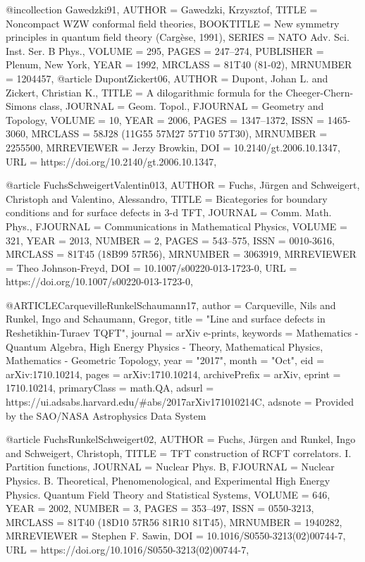 @incollection {Gawedzki91,
    AUTHOR = {Gaw\polhk edzki, Krzysztof},
     TITLE = {Noncompact {WZW} conformal field theories},
 BOOKTITLE = {New symmetry principles in quantum field theory ({C}arg\`ese,
              1991)},
    SERIES = {NATO Adv. Sci. Inst. Ser. B Phys.},
    VOLUME = {295},
     PAGES = {247--274},
 PUBLISHER = {Plenum, New York},
      YEAR = {1992},
   MRCLASS = {81T40 (81-02)},
  MRNUMBER = {1204457},
}
@article {DupontZickert06,
    AUTHOR = {Dupont, Johan L. and Zickert, Christian K.},
     TITLE = {A dilogarithmic formula for the {C}heeger-{C}hern-{S}imons
              class},
   JOURNAL = {Geom. Topol.},
  FJOURNAL = {Geometry and Topology},
    VOLUME = {10},
      YEAR = {2006},
     PAGES = {1347--1372},
      ISSN = {1465-3060},
   MRCLASS = {58J28 (11G55 57M27 57T10 57T30)},
  MRNUMBER = {2255500},
MRREVIEWER = {Jerzy Browkin},
       DOI = {10.2140/gt.2006.10.1347},
       URL = {https://doi.org/10.2140/gt.2006.10.1347},
}


@article {FuchsSchweigertValentin013,
    AUTHOR = {Fuchs, J\"{u}rgen and Schweigert, Christoph and Valentino,
              Alessandro},
     TITLE = {Bicategories for boundary conditions and for surface defects
              in 3-d {TFT}},
   JOURNAL = {Comm. Math. Phys.},
  FJOURNAL = {Communications in Mathematical Physics},
    VOLUME = {321},
      YEAR = {2013},
    NUMBER = {2},
     PAGES = {543--575},
      ISSN = {0010-3616},
   MRCLASS = {81T45 (18B99 57R56)},
  MRNUMBER = {3063919},
MRREVIEWER = {Theo Johnson-Freyd},
       DOI = {10.1007/s00220-013-1723-0},
       URL = {https://doi.org/10.1007/s00220-013-1723-0},
}

@ARTICLE{CarquevilleRunkelSchaumann17,
       author = {{Carqueville}, Nils and {Runkel}, Ingo and {Schaumann}, Gregor},
        title = "{Line and surface defects in Reshetikhin-Turaev TQFT}",
      journal = {arXiv e-prints},
     keywords = {Mathematics - Quantum Algebra, High Energy Physics - Theory, Mathematical Physics, Mathematics - Geometric Topology},
         year = "2017",
        month = "Oct",
          eid = {arXiv:1710.10214},
        pages = {arXiv:1710.10214},
archivePrefix = {arXiv},
       eprint = {1710.10214},
 primaryClass = {math.QA},
       adsurl = {https://ui.adsabs.harvard.edu/\#abs/2017arXiv171010214C},
      adsnote = {Provided by the SAO/NASA Astrophysics Data System}
}

@article {FuchsRunkelSchweigert02,
    AUTHOR = {Fuchs, J\"{u}rgen and Runkel, Ingo and Schweigert, Christoph},
     TITLE = {T{FT} construction of {RCFT} correlators. {I}. {P}artition
              functions},
   JOURNAL = {Nuclear Phys. B},
  FJOURNAL = {Nuclear Physics. B. Theoretical, Phenomenological, and
              Experimental High Energy Physics. Quantum Field Theory and
              Statistical Systems},
    VOLUME = {646},
      YEAR = {2002},
    NUMBER = {3},
     PAGES = {353--497},
      ISSN = {0550-3213},
   MRCLASS = {81T40 (18D10 57R56 81R10 81T45)},
  MRNUMBER = {1940282},
MRREVIEWER = {Stephen F. Sawin},
       DOI = {10.1016/S0550-3213(02)00744-7},
       URL = {https://doi.org/10.1016/S0550-3213(02)00744-7},
}

